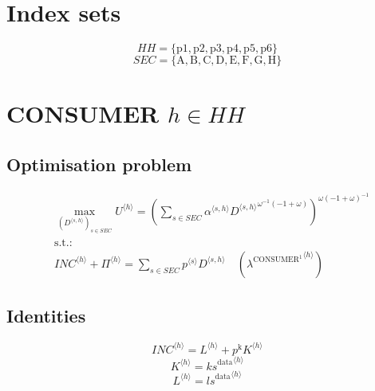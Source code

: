 

\section*{Index sets}

$${H\!H} = \{ \mathrm{p1}, \mathrm{p2}, \mathrm{p3}, \mathrm{p4}, \mathrm{p5}, \mathrm{p6} \}$$
$${S\!E\!C} = \{ \mathrm{A}, \mathrm{B}, \mathrm{C}, \mathrm{D}, \mathrm{E}, \mathrm{F}, \mathrm{G}, \mathrm{H} \}$$

\section{CONSUMER $h\in {H\!H}$}

\subsection{Optimisation problem}

\begin{align}
&\max_{\left({D}^{\langle s,h\rangle}\right)_{s\in {S\!E\!C}}
} {U}^{\langle h\rangle} = \left(\sum_{s\in {S\!E\!C}} {{\alpha}^{\langle s,h\rangle}} {{{D}^{\langle s,h\rangle}}^{{\omega}^{-1} \left(-1 + \omega\right)}}\right)^{{\omega} \left(-1 + \omega\right)^{-1}}\\
&\mathrm{s.t.:}\nonumber\\
& {{I\!N\!C}}^{\langle h\rangle} + {\Pi}^{\langle h\rangle} = \sum_{s\in {S\!E\!C}} {{p}^{\langle s\rangle}} {{D}^{\langle s,h\rangle}} \quad \left({\lambda^{\mathrm{CONSUMER}^{\mathrm{1}}}}^{\langle h\rangle}\right)
\end{align}


\subsection{Identities}

\begin{equation}
{{I\!N\!C}}^{\langle h\rangle} = {L}^{\langle h\rangle} + {p^{\mathrm{k}}} {{K}^{\langle h\rangle}}
\end{equation}
\begin{equation}
{K}^{\langle h\rangle} = {{k\!s}^{\mathrm{data}}}^{\langle h\rangle}
\end{equation}
\begin{equation}
{L}^{\langle h\rangle} = {{l\!s}^{\mathrm{data}}}^{\langle h\rangle}
\end{equation}


